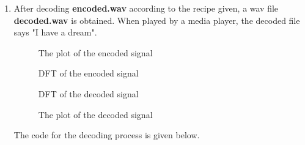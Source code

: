 \documentclass[10pt,a4paper, margin=1in]{article}
\begin{document}
\begin{enumerate}
\item After decoding \textbf{encoded.wav} according to the recipe given, a wav file \textbf{decoded.wav} is obtained.
When played by a media player, the decoded file says "I have a dream".

\begin{figure}[H]
    \centering
    
    \caption{The plot of the encoded signal}
\end{figure}

\begin{figure}[H]
    \centering
    
    \caption{DFT of the encoded signal}
\end{figure}

\begin{figure}[H]
    \centering
    
    \caption{DFT of the decoded signal}
\end{figure}

\begin{figure}[H]
    \centering
    
    \caption{The plot of the decoded signal}
\end{figure}


The code for the decoding process is given below.
\inputminted{python}{hw4.py}


\end{enumerate}
\end{document}
